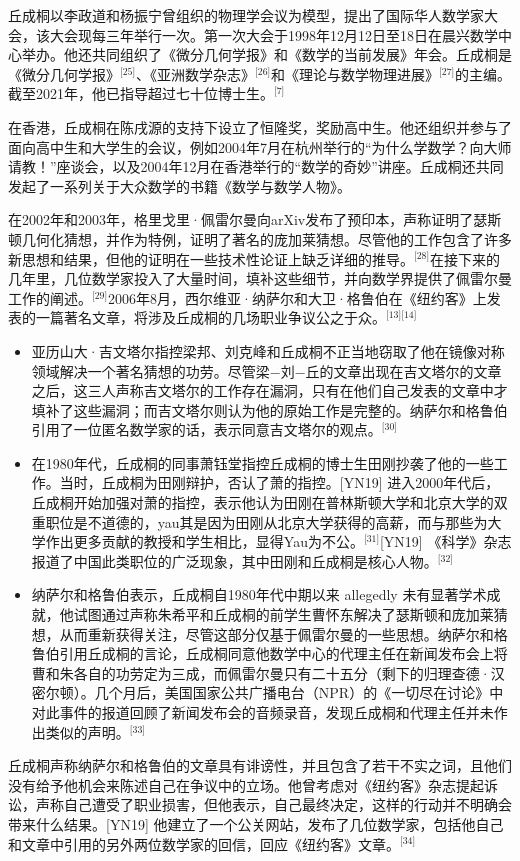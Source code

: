 丘成桐以李政道和杨振宁曾组织的物理学会议为模型，提出了国际华人数学家大会，该大会现每三年举行一次。第一次大会于1998年12月12日至18日在晨兴数学中心举办。他还共同组织了《微分几何学报》和《数学的当前发展》年会。丘成桐是《微分几何学报》\(^\text{[25]}\)、《亚洲数学杂志》\(^\text{[26]}\)和《理论与数学物理进展》\(^\text{[27]}\)的主编。截至2021年，他已指导超过七十位博士生。\(^\text{[7]}\)

在香港，丘成桐在陈戌源的支持下设立了恒隆奖，奖励高中生。他还组织并参与了面向高中生和大学生的会议，例如2004年7月在杭州举行的“为什么学数学？向大师请教！”座谈会，以及2004年12月在香港举行的“数学的奇妙”讲座。丘成桐还共同发起了一系列关于大众数学的书籍《数学与数学人物》。

在2002年和2003年，格里戈里·佩雷尔曼向arXiv发布了预印本，声称证明了瑟斯顿几何化猜想，并作为特例，证明了著名的庞加莱猜想。尽管他的工作包含了许多新思想和结果，但他的证明在一些技术性论证上缺乏详细的推导。\(^\text{[28]}\)在接下来的几年里，几位数学家投入了大量时间，填补这些细节，并向数学界提供了佩雷尔曼工作的阐述。\(^\text{[29]}\)2006年8月，西尔维亚·纳萨尔和大卫·格鲁伯在《纽约客》上发表的一篇著名文章，将涉及丘成桐的几场职业争议公之于众。\(^\text{[13][14]}\)
\begin{itemize}
\item 亚历山大·吉文塔尔指控梁邦、刘克峰和丘成桐不正当地窃取了他在镜像对称领域解决一个著名猜想的功劳。尽管梁−刘−丘的文章出现在吉文塔尔的文章之后，这三人声称吉文塔尔的工作存在漏洞，只有在他们自己发表的文章中才填补了这些漏洞；而吉文塔尔则认为他的原始工作是完整的。纳萨尔和格鲁伯引用了一位匿名数学家的话，表示同意吉文塔尔的观点。\(^\text{[30]}\)
\item 在1980年代，丘成桐的同事萧钰堂指控丘成桐的博士生田刚抄袭了他的一些工作。当时，丘成桐为田刚辩护，否认了萧的指控。[YN19] 进入2000年代后，丘成桐开始加强对萧的指控，表示他认为田刚在普林斯顿大学和北京大学的双重职位是不道德的，yau其是因为田刚从北京大学获得的高薪，而与那些为大学作出更多贡献的教授和学生相比，显得Yau为不公。\(^\text{[31]}\)[YN19] 《科学》杂志报道了中国此类职位的广泛现象，其中田刚和丘成桐是核心人物。\(^\text{[32]}\) 
\item 纳萨尔和格鲁伯表示，丘成桐自1980年代中期以来 allegedly 未有显著学术成就，他试图通过声称朱希平和丘成桐的前学生曹怀东解决了瑟斯顿和庞加莱猜想，从而重新获得关注，尽管这部分仅基于佩雷尔曼的一些思想。纳萨尔和格鲁伯引用丘成桐的言论，丘成桐同意他数学中心的代理主任在新闻发布会上将曹和朱各自的功劳定为三成，而佩雷尔曼只有二十五分（剩下的归理查德·汉密尔顿）。几个月后，美国国家公共广播电台（NPR）的《一切尽在讨论》中对此事件的报道回顾了新闻发布会的音频录音，发现丘成桐和代理主任并未作出类似的声明。\(^\text{[33]}\)
\end{itemize}
丘成桐声称纳萨尔和格鲁伯的文章具有诽谤性，并且包含了若干不实之词，且他们没有给予他机会来陈述自己在争议中的立场。他曾考虑对《纽约客》杂志提起诉讼，声称自己遭受了职业损害，但他表示，自己最终决定，这样的行动并不明确会带来什么结果。[YN19] 他建立了一个公关网站，发布了几位数学家，包括他自己和文章中引用的另外两位数学家的回信，回应《纽约客》文章。\(^\text{[34]}\)


